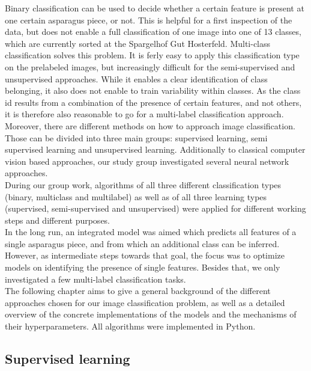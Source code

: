 Binary classification can be used to decide whether a certain feature is present at one certain asparagus piece, or not. This is helpful for a first inspection of the data, but does not enable a full classification of one image into one of 13 classes, which are currently sorted at the Spargelhof Gut Hosterfeld. Multi-class classification solves this problem. It is ferly easy to apply this classification type on the prelabeled images, but increasingly difficult for the semi-supervised and unsupervised approaches. While it enables a clear identification of class belonging, it also does not enable to train variability within classes. As the class id results from a combination of the presence of certain features, and not others, it is therefore also reasonable to go for a multi-label classification approach. \\

Moreover, there are different methods on how to approach image classification. Those can be divided into three main groups: supervised learning, semi supervised learning and unsupervised learning. Additionally to classical computer vision based approaches, our study group investigated several neural network approaches. \\

During our group work, algorithms of all three different classification types (binary, multiclass and multilabel) as well as of all three learning types (supervised, semi-supervised and unsupervised) were applied for different working steps and different purposes. \\

In the long run, an integrated model was aimed which predicts all features of a single asparagus piece, and from which an additional class can be inferred. However, as intermediate steps towards that goal, the focus was to optimize models on identifying the presence of single features. Besides that, we only investigated a few multi-label classification tasks. \\

The following chapter aims to give a general background of the different approaches chosen for our image classification problem, as well as a detailed overview of the concrete implementations of the models and the mechanisms of their hyperparameters.
All algorithms were implemented in Python.  \\



\subsection{Supervised learning}

